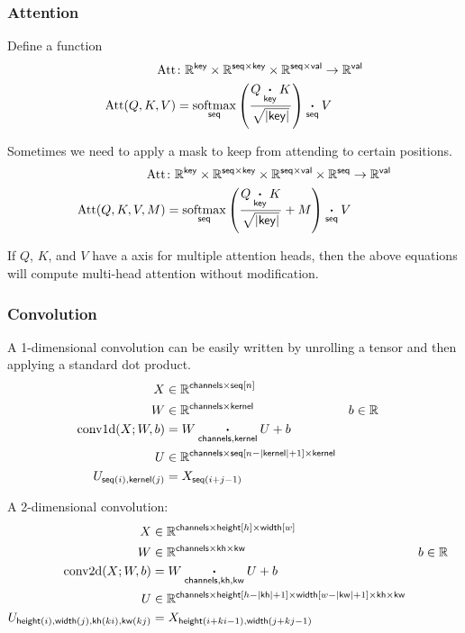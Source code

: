 \documentclass{article}
\newcommand{\reals}{\mathbb{R}}
\begin{document}
\subsubsection{Attention}
\label{sec:attention}

Define a function
\begin{align*}
  \text{Att} &\colon \mathbb{R}^{\name{key}} \times \mathbb{R}^{\name{seq} \times\name{key}} \times \mathbb{R}^{\name{seq} \times\name{val}} \rightarrow \mathbb{R}^{\name{val}} \\
  \text{Att}(Q,K,V) &= \nfun{seq}{softmax} \left( \frac{Q \ndot{key} K}{\sqrt{|\name{key}|}} \right) \ndot{seq} V
\end{align*}

Sometimes we need to apply a mask to keep from attending to certain positions.
\begin{align*} 
  \text{Att} &\colon \mathbb{R}^{\name{key}} \times \mathbb{R}^{\name{seq} \times\name{key}} \times \mathbb{R}^{\name{seq} \times\name{val}} \times \mathbb{R}^{\name{seq}} \rightarrow \mathbb{R}^{\name{val}} \\
\text{Att}(Q, K, V, M) &=  \nfun{seq}{softmax} \left( \frac{Q \ndot{key} K}{\sqrt{|\name{key}|}} + M \right) \ndot{seq} V 
\end{align*}

If $Q$, $K$, and $V$ have a  axis for multiple attention heads, then the above equations will compute multi-head attention without modification.

\subsubsection{Convolution}

A 1-dimensional convolution can be easily written by unrolling a tensor and then
applying a standard dot product.
\begin{align*}
X &\in \reals^{\name{channels} \times \nset{seq}{n}}  \\
W &\in \reals^{\name{channels} \times \name{kernel}} &
b &\in \reals \\
\text{conv1d}(X; W, b) &= W \ndot{channels, kernel} U + b \\
U &\in \reals^{\name{channels} \times \nset{seq}{n-|\name{kernel}|+1} \times \name{kernel}}  \\
U_{\nidx{seq}{i}, \nidx{kernel}{j}} & = X_{\nidx{seq}{i+j - 1}}  
\end{align*} 

A 2-dimensional convolution:
\begin{align*}
X &\in \reals^{\name{channels} \times \nset{height}{h} \times \nset{width}{w}} \\
W &\in \reals^{\name{channels} \times \name{kh} \times \name{kw}} &
b &\in \reals \\
\text{conv2d}(X; W, b) &=  W \ndot{channels, kh, kw} U + b \\
U &\in \reals^{\name{channels} \times \nset{height}{h-|\name{kh}|+1} \times
\nset{width}{w-|\name{kw}|+1} \times \name{kh} \times \name{kw}}  \\
U_{\nidx{height}{i}, \nidx{width}{j}, \nidx{kh}{ki}, \nidx{kw}{kj}} &= X_{\nidx{height}{i+ki-1}, \nidx{width}{j+kj-1}}  
\end{align*}
\end{document}
